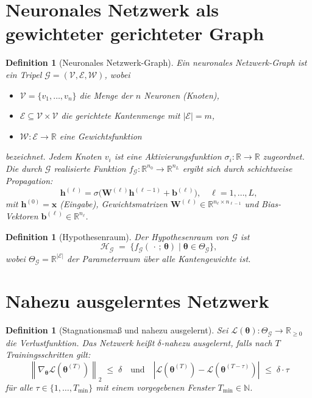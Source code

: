 \documentclass[12pt, a4paper, openany]{report}
\newtheorem{definition}[theorem]{Definition}
\newcommand{\R}{\mathbb{R}}
\newcommand{\N}{\mathbb{N}}
\newcommand{\calG}{\mathcal{G}}
\newcommand{\calH}{\mathcal{H}}
\newcommand{\calL}{\mathcal{L}}
\newcommand{\calV}{\mathcal{V}}
\newcommand{\calE}{\mathcal{E}}
\newcommand{\calW}{\mathcal{W}}
\newcommand{\norms}[1]{\left\|#1\right\|}
\newcommand{\abs}[1]{\left|#1\right|}
\begin{document}
\section{Neuronales Netzwerk als gewichteter gerichteter Graph}

\begin{definition}[Neuronales Netzwerk-Graph]
\label{def:nngraph}
Ein \emph{neuronales Netzwerk-Graph} ist ein Tripel
$\calG = (\calV, \calE, \calW)$, wobei
\begin{itemize}
  \item $\calV = \{v_1, \ldots, v_n\}$ die Menge der $n$ Neuronen (Knoten),
  \item $\calE \subseteq \calV \times \calV$ die gerichtete Kantenmenge mit
        $|\calE| = m$,
  \item $\calW : \calE \to \R$ eine Gewichtsfunktion
\end{itemize}
bezeichnet.  Jedem Knoten $v_i$ ist eine Aktivierungsfunktion
$\sigma_i : \R \to \R$ zugeordnet.  Die durch $\calG$ realisierte Funktion
$f_{\calG} : \R^{n_0} \to \R^{n_L}$ ergibt sich durch schichtweise Propagation:
\begin{equation}
  \label{eq:propagation}
  \bm{h}^{(\ell)} = \sigma\!\bigl(\bm{W}^{(\ell)} \bm{h}^{(\ell-1)} + \bm{b}^{(\ell)}\bigr),
  \quad \ell = 1, \ldots, L,
\end{equation}
mit $\bm{h}^{(0)} = \bm{x}$ (Eingabe), Gewichtsmatrizen
$\bm{W}^{(\ell)} \in \R^{n_\ell \times n_{\ell-1}}$ und Bias-Vektoren
$\bm{b}^{(\ell)} \in \R^{n_\ell}$.
\end{definition}

\begin{definition}[Hypothesenraum]
\label{def:hyp}
Der \emph{Hypothesenraum} von $\calG$ ist
\[
  \calH_{\calG} \;=\;
  \bigl\{f_{\calG}(\,\cdot\,;\,\bm{\theta}) \;\big|\; \bm{\theta} \in \Theta_{\calG}\bigr\},
\]
wobei $\Theta_{\calG} = \R^{|\calE|}$ der Parameterraum über alle Kantengewichte ist.
\end{definition}

\section{Nahezu ausgelerntes Netzwerk}

\begin{definition}[Stagnationsmaß und nahezu ausgelernt]
\label{def:nearconv}
Sei $\calL(\bm{\theta}) : \Theta_{\calG} \to \R_{\geq 0}$ die Verlustfunktion.
Das Netzwerk heißt \emph{$\delta$-nahezu ausgelernt}, falls nach $T$ Trainingsschritten
gilt:
\begin{equation}
  \label{eq:stagnation}
  \norms{\nabla_{\bm{\theta}} \calL(\bm{\theta}^{(T)})}_2 \;\leq\; \delta
  \quad \text{und} \quad
  \abs{\calL(\bm{\theta}^{(T)}) - \calL(\bm{\theta}^{(T-\tau)})}_{}
  \;\leq\; \delta \cdot \tau
\end{equation}
für alle $\tau \in \{1, \ldots, T_{\min}\}$ mit einem vorgegebenen Fenster $T_{\min} \in \N$.
\end{definition}
\end{document}
